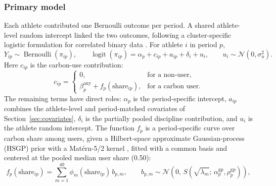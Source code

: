 \subsubsection{Primary model}
\label{sec:primary-model}
Each athlete contributed one Bernoulli outcome per period. A shared athlete-level random intercept linked the two outcomes, following a cluster-specific logistic formulation for correlated binary data \citep{neuhaus1991correlated}. For athlete $i$ in period $p$,
\[
Y_{ip}\sim\operatorname{Bernoulli}(\pi_{ip}),
\qquad
\operatorname{logit}(\pi_{ip})=\alpha_p+c_{ip}+a_{ip}+\delta_i+u_i,
\qquad
u_i\sim\mathcal{N}(0,\sigma_u^2).
\]
Here $c_{ip}$ is the carbon-use contribution:
\[
c_{ip}=\begin{cases}
0, & \text{for a non-user},\\
\beta^{\text{any}}_p+f_p(\text{share}_{ip}), & \text{for a carbon user}.
\end{cases}
\]
The remaining terms have direct roles: $\alpha_p$ is the period-specific intercept, $a_{ip}$ combines the athlete-level and period-matched covariates of Section~\ref{sec:covariates}, $\delta_i$ is the partially pooled discipline contribution, and $u_i$ is the athlete random intercept. The function $f_p$ is a period-specific curve over carbon share among users, given a Hilbert-space approximate Gaussian-process (HSGP) prior with a Mat\'ern-5/2 kernel \citep{riutortmayol2023hsgp}, fitted with a common basis and centered at the pooled median user share (0.50):
\[
f_p(\text{share}_{ip}) = \sum_{m=1}^{40} \phi_m(\text{share}_{ip})\, b_{p,m},
\qquad
b_{p,m} \sim \mathcal N\!\left(0,\, S\!\left(\sqrt{\lambda_m};\, \alpha^{\text{gp}}_p, \rho^{\text{gp}}_p\right)\right),
\]
